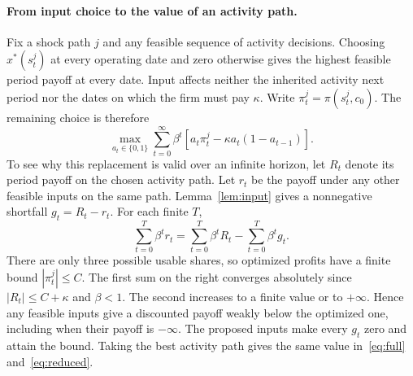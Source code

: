 \documentclass[11pt,letterpaper]{article}
\begin{document}
\paragraph{From input choice to the value of an activity path.}
Fix a shock path $j$ and any feasible sequence of activity decisions. Choosing $x^*(s_t^j)$ at every operating date and zero otherwise gives the highest feasible period payoff at every date. Input affects neither the inherited activity next period nor the dates on which the firm must pay $\kappa$. Write $\pi_t^j=\pi(s_t^j,c_0)$. The remaining choice is therefore
\begin{equation}\label{eq:reduced}
\max_{a_t\in\{0,1\}}\sum_{t=0}^{\infty}\beta^t
\left[a_t\pi_t^j-\kappa a_t(1-a_{t-1})\right].
\end{equation}
To see why this replacement is valid over an infinite horizon, let $R_t$ denote its period payoff on the chosen activity path. Let $r_t$ be the payoff under any other feasible inputs on the same path. Lemma~\ref{lem:input} gives a nonnegative shortfall $g_t=R_t-r_t$. For each finite $T$,
\[
 \sum_{t=0}^{T}\beta^t r_t
  =\sum_{t=0}^{T}\beta^t R_t-\sum_{t=0}^{T}\beta^t g_t .
\]
There are only three possible usable shares, so optimized profits have a finite bound $|\pi_t^j|\leq C$. The first sum on the right converges absolutely since $|R_t|\leq C+\kappa$ and $\beta<1$. The second increases to a finite value or to $+\infty$. Hence any feasible inputs give a discounted payoff weakly below the optimized one, including when their payoff is $-\infty$. The proposed inputs make every $g_t$ zero and attain the bound. Taking the best activity path gives the same value in~\eqref{eq:full} and~\eqref{eq:reduced}.
\end{document}
